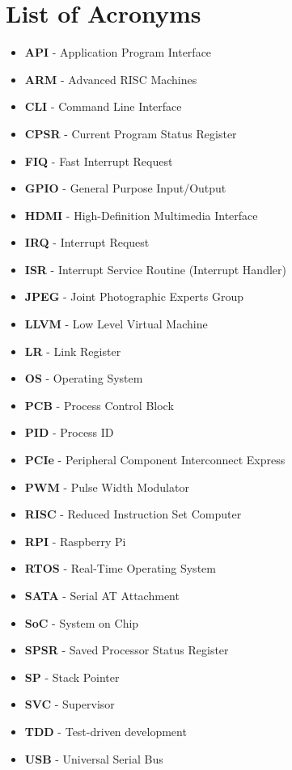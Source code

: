 \chapter{List of Acronyms}

\begin{itemize}
\item\textbf{API} - Application Program Interface
\item\textbf{ARM} - Advanced RISC Machines
\item\textbf{CLI} - Command Line Interface
\item\textbf{CPSR} - Current Program Status Register
\item\textbf{FIQ} - Fast Interrupt Request
\item\textbf{GPIO} - General Purpose Input/Output
\item\textbf{HDMI} - High-Definition Multimedia Interface
\item\textbf{IRQ} - Interrupt Request
\item\textbf{ISR} - Interrupt Service Routine (Interrupt Handler)
\item\textbf{JPEG} - Joint Photographic Experts Group
\item\textbf{LLVM} - Low Level Virtual Machine
\item\textbf{LR} - Link Register
\item\textbf{OS} - Operating System
\item\textbf{PCB} - Process Control Block
\item\textbf{PID} - Process ID
\item\textbf{PCIe} - Peripheral Component Interconnect Express
\item\textbf{PWM} - Pulse Width Modulator
\item\textbf{RISC} - Reduced Instruction Set Computer
\item\textbf{RPI} - Raspberry Pi
\item\textbf{RTOS} - Real-Time Operating System
\item\textbf{SATA} - Serial AT Attachment
\item\textbf{SoC} - System on Chip
\item\textbf{SPSR} - Saved Processor Status Register
\item\textbf{SP} - Stack Pointer
\item\textbf{SVC} - Supervisor
\item\textbf{TDD} - Test-driven development
\item\textbf{USB} - Universal Serial Bus
\end{itemize}